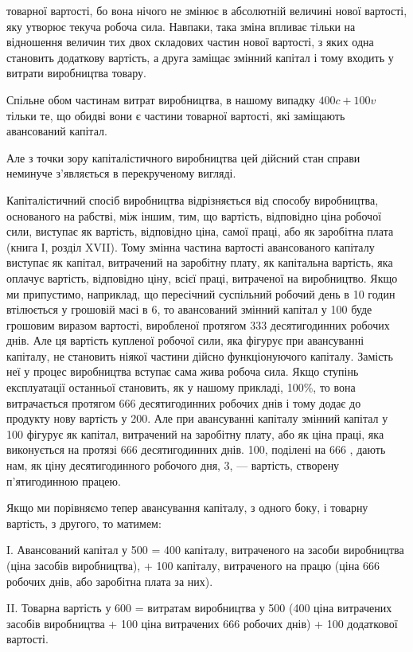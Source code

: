\parcont{}  %
товарної вартості, бо вона нічого не змінює в абсолютній величині
нової вартості, яку утворює текуча робоча сила. Навпаки,
така зміна впливає тільки на відношення величин тих двох складових
частин нової вартості, з яких одна становить додаткову
вартість, а друга заміщає змінний капітал і тому входить у витрати
виробництва товару.

Спільне обом частинам витрат виробництва, в нашому випадку
$400 c + 100v$ тільки те, що обидві вони є частини товарної
вартості, які заміщають авансований капітал.

Але з точки зору капіталістичного виробництва цей дійсний
стан справи неминуче з’являється в перекрученому вигляді.

Капіталістичний спосіб виробництва відрізняється від способу
виробництва, основаного на рабстві, між іншим, тим, що
вартість, відповідно ціна робочої сили, виступає як вартість,
відповідно ціна, самої праці, або як заробітна плата (книга І,
розділ XVII). Тому змінна частина вартості авансованого капіталу
виступає як капітал, витрачений на заробітну плату,
як капітальна вартість, яка оплачує вартість, відповідно ціну,
всієї праці, витраченої на виробництво. Якщо ми припустимо,
наприклад, що пересічний суспільний робочий день в 10 годин
втілюється у грошовій масі в 6, то авансований
змінний капітал у 100 буде грошовим
виразом вартості, виробленої протягом 333 десятигодинних
робочих днів. Але ця вартість купленої робочої сили, яка фігурує
при авансуванні капіталу, не становить ніякої частини
дійсно функціонуючого капіталу. Замість неї у процес виробництва
вступає сама жива робоча сила. Якщо ступінь експлуатації
останньої становить, як у нашому прикладі, 100\%, то вона
витрачається протягом 666 десятигодинних робочих днів і тому
додає до продукту нову вартість у 200. Але
при авансуванні капіталу змінний капітал у 100
фігурує як капітал, витрачений на заробітну плату, або як
ціна праці, яка виконується на протязі 666  десятигодинних
днів. 100, поділені на 666 , дають нам, як
ціну десятигодинного робочого дня, 3, — вартість, створену
п’ятигодинною працею.

Якщо ми порівняємо тепер авансування капіталу, з одного
боку, і товарну вартість, з другого, то матимем:

I. Авансований капітал у 500 = 400 капіталу, витраченого на засоби виробництва
(ціна засобів виробництва), + 100 капіталу,
витраченого на працю (ціна 666 робочих днів, або заробітна
плата за них).

II. Товарна вартість у 600 = витратам виробництва
у 500 (400
ціна витрачених засобів виробництва + 100
ціна витрачених 666 робочих днів) + 100 додаткової вартості.
